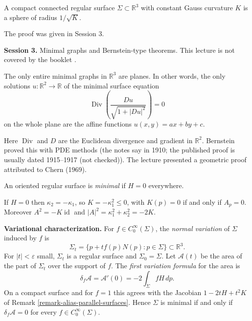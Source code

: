 \begin{theorem}[Liebmann, 1899]
\label{theorem-alias-liebmann}
A compact connected regular surface
$\Sigma\subset\mathbb{R}^3$ with constant
Gauss curvature $K$ is a sphere of radius
$1/\sqrt{K}$.
\end{theorem}

The proof was given in Session 3.

\medskip\noindent
{\bf Session 3.}
Minimal graphs and Bernstein-type
theorems. This lecture is not covered by
the booklet \cite{alias2006analisis}.

\begin{theorem}[Bernstein]
\label{theorem-alias-bernstein}
The only entire minimal graphs in
$\mathbb{R}^3$ are planes. In other
words, the only solutions
$u:\mathbb{R}^2\to\mathbb{R}$ of the
minimal surface equation
$$
\operatorname{Div}\left(
\frac{Du}{\sqrt{1+|Du|^2}}
\right)=0
$$
on the whole plane are the affine
functions $u(x,y)=ax+by+c$.
\end{theorem}

Here $\operatorname{Div}$ and $D$ are
the Euclidean divergence and gradient in
$\mathbb{R}^2$. Bernstein proved this
with PDE methods (the notes say in 1910;
the published proof is usually dated
1915--1917 (not checked)). The lecture
presented a geometric proof attributed to
Chern (1969).

\begin{definition}
\label{definition-alias-minimal}
An oriented regular surface is
\emph{minimal} if $H=0$ everywhere.
\end{definition}

If $H=0$ then $\kappa_2=-\kappa_1$, so
$K=-\kappa_1^2\leq 0$, with $K(p)=0$ if
and only if $A_p=0$. Moreover
$A^2=-K\operatorname{id}$ and
$|A|^2=\kappa_1^2+\kappa_2^2=-2K$.

\medskip\noindent
{\bf Variational characterization.}
For $f\in C_0^\infty(\Sigma)$, the
\emph{normal variation} of $\Sigma$
induced by $f$ is
$$
\Sigma_t=\{p+tf(p)N(p):p\in\Sigma\}
\subset\mathbb{R}^3.
$$
For $|t|<\varepsilon$ small, $\Sigma_t$ is
a regular surface and $\Sigma_0=\Sigma$.
Let $\mathcal{A}(t)$ be the area of
the part of $\Sigma_t$ over the support of
$f$. The \emph{first variation formula}
for the area is
$$
\delta_f\mathcal{A}
=\mathcal{A}'(0)
=-2\int_\Sigma fH\,dp.
$$
On a compact surface and for $f=1$ this
agrees with the Jacobian $1-2tH+t^2K$ of
Remark
\ref{remark-alias-parallel-surfaces}.
Hence $\Sigma$ is minimal if and only if
$\delta_f\mathcal{A}=0$ for every
$f\in C_0^\infty(\Sigma)$.

